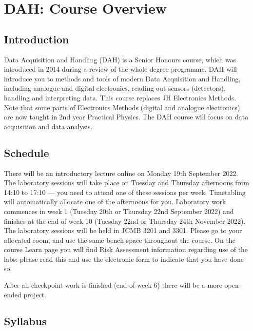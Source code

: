 \chapter{DAH: Course Overview}
\label{sec:overview}

\section{Introduction}

Data Acquisition and Handling (DAH) is a Senior Honours course, which was introduced in 2014 during a review of the whole degree programme.
DAH will introduce you to methods and tools of modern Data Acquisition and Handling, including analogue and digital electronics, reading out sensors (detectors), handling and interpreting data.
This course replaces JH Electronics Methods.
Note that some parts of Electronics Methods (digital and analogue electronics) are now taught in 2nd year Practical Physics.
The DAH course will focus on data acquisition and data analysis.

\section{Schedule}

There will be an introductory lecture online on Monday 19th September 2022.
The laboratory sessions will take place on Tuesday and Thursday afternoons from 14:10 to 17:10 --- you need to attend one of these sessions per week.
Timetabling will automatically allocate one of the afternoons for you.
Laboratory work commences in week 1 (Tuesday 20th or Thursday 22nd September 2022) and finishes at the end of week 10 (Tuesday 22nd or Thursday 24th November 2022).
The laboratory sessions will be held in JCMB 3201 and 3301.
Please go to your allocated room, and use the same bench space throughout the course.
On the course Learn page you will find Risk Assessment information regarding use of the labs: please read this and use the electronic form to indicate that you have done so.

After all checkpoint work is finished (end of week 6) there will be a more open-ended project.

\newpage
\section{Syllabus}

